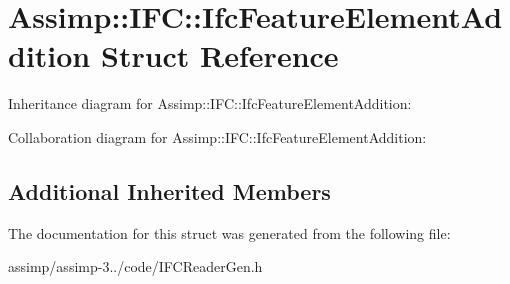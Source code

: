 \hypertarget{struct_assimp_1_1_i_f_c_1_1_ifc_feature_element_addition}{\section{Assimp\+:\+:I\+F\+C\+:\+:Ifc\+Feature\+Element\+Addition Struct Reference}
\label{struct_assimp_1_1_i_f_c_1_1_ifc_feature_element_addition}
}


Inheritance diagram for Assimp\+:\+:I\+F\+C\+:\+:Ifc\+Feature\+Element\+Addition\+:


Collaboration diagram for Assimp\+:\+:I\+F\+C\+:\+:Ifc\+Feature\+Element\+Addition\+:
\subsection*{Additional Inherited Members}


The documentation for this struct was generated from the following file\+:\begin{DoxyCompactItemize}
\item 
assimp/assimp-\/3../code/I\+F\+C\+Reader\+Gen.\+h\end{DoxyCompactItemize}
